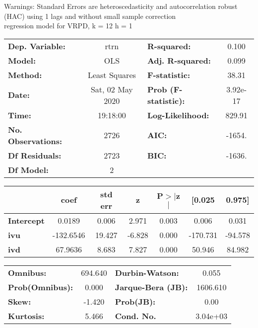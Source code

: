 Warnings: \newline
 [1] Standard Errors are heteroscedasticity and autocorrelation robust (HAC) using 1 lags and without small sample correction\\ 

regression model for VRPD, k = 12 h = 1\begin{center}
\begin{tabular}{lclc}
\toprule
\textbf{Dep. Variable:}    &       rtrn       & \textbf{  R-squared:         } &     0.100   \\
\textbf{Model:}            &       OLS        & \textbf{  Adj. R-squared:    } &     0.099   \\
\textbf{Method:}           &  Least Squares   & \textbf{  F-statistic:       } &     38.31   \\
\textbf{Date:}             & Sat, 02 May 2020 & \textbf{  Prob (F-statistic):} &  3.92e-17   \\
\textbf{Time:}             &     19:18:00     & \textbf{  Log-Likelihood:    } &    829.91   \\
\textbf{No. Observations:} &        2726      & \textbf{  AIC:               } &    -1654.   \\
\textbf{Df Residuals:}     &        2723      & \textbf{  BIC:               } &    -1636.   \\
\textbf{Df Model:}         &           2      & \textbf{                     } &             \\
\bottomrule
\end{tabular}
\begin{tabular}{lcccccc}
                   & \textbf{coef} & \textbf{std err} & \textbf{z} & \textbf{P$> |$z$|$} & \textbf{[0.025} & \textbf{0.975]}  \\
\midrule
\textbf{Intercept} &       0.0189  &        0.006     &     2.971  &         0.003        &        0.006    &        0.031     \\
\textbf{ivu}       &    -132.6546  &       19.427     &    -6.828  &         0.000        &     -170.731    &      -94.578     \\
\textbf{ivd}       &      67.9636  &        8.683     &     7.827  &         0.000        &       50.946    &       84.982     \\
\bottomrule
\end{tabular}
\begin{tabular}{lclc}
\textbf{Omnibus:}       & 694.640 & \textbf{  Durbin-Watson:     } &    0.055  \\
\textbf{Prob(Omnibus):} &   0.000 & \textbf{  Jarque-Bera (JB):  } & 1606.610  \\
\textbf{Skew:}          &  -1.420 & \textbf{  Prob(JB):          } &     0.00  \\
\textbf{Kurtosis:}      &   5.466 & \textbf{  Cond. No.          } & 3.04e+03  \\
\bottomrule
\end{tabular}
\end{center}

